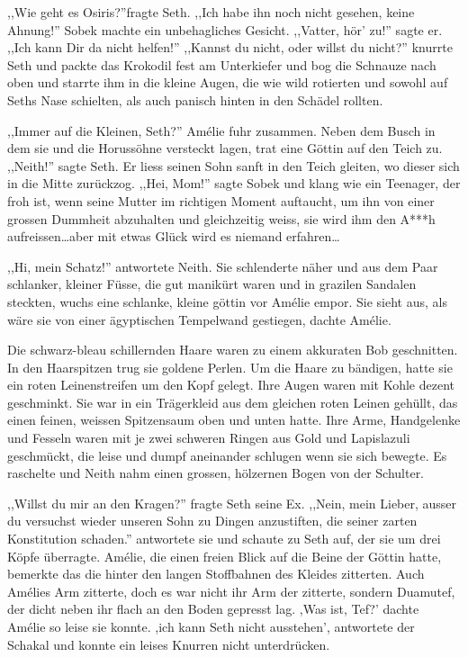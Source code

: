 \documentclass[11pt,titlepage,a5paper]{book}
\begin{document}
,,Wie geht es Osiris?''fragte Seth. ,,Ich habe ihn noch nicht gesehen, keine Ahnung!'' Sobek machte ein unbehagliches Gesicht. ,,Vatter, hör' zu!'' sagte er. ,,Ich kann Dir da nicht helfen!'' ,,Kannst du nicht, oder willst du nicht?'' knurrte Seth und packte das Krokodil fest am Unterkiefer und bog die Schnauze nach oben und starrte ihm in die kleine Augen, die wie wild rotierten und sowohl auf Seths Nase schielten, als auch panisch hinten in den Schädel rollten.

,,Immer auf die Kleinen, Seth?'' Amélie fuhr zusammen. Neben dem Busch in dem sie und die Horussöhne versteckt lagen, trat eine Göttin auf den Teich zu. ,,Neith!'' sagte Seth. Er liess seinen Sohn sanft in den Teich gleiten, wo dieser sich in die Mitte zurückzog. ,,Hei, Mom!'' sagte Sobek und klang wie ein Teenager, der froh ist, wenn seine Mutter im richtigen Moment auftaucht, um ihn von einer grossen Dummheit abzuhalten und gleichzeitig weiss, sie wird ihm den A***h aufreissen\dots aber mit etwas Glück wird es niemand erfahren\dots

,,Hi, mein Schatz!'' antwortete Neith. Sie schlenderte näher und aus dem Paar schlanker, kleiner Füsse, die gut manikürt waren und in grazilen Sandalen steckten, wuchs eine schlanke, kleine göttin vor Amélie empor. Sie sieht aus, als wäre sie von einer ägyptischen Tempelwand gestiegen, dachte Amélie.

Die schwarz-bleau schillernden Haare waren zu einem akkuraten Bob geschnitten. In den Haarspitzen trug sie goldene Perlen. Um die Haare zu bändigen, hatte sie ein roten Leinenstreifen um den Kopf gelegt. Ihre Augen waren mit Kohle dezent geschminkt. Sie war in ein Trägerkleid aus dem gleichen roten Leinen gehüllt, das einen feinen, weissen Spitzensaum oben und unten hatte. Ihre Arme, Handgelenke und Fesseln waren mit je zwei schweren Ringen aus Gold und Lapislazuli geschmückt, die leise und dumpf aneinander schlugen wenn sie sich bewegte. Es raschelte und Neith nahm einen grossen, hölzernen Bogen von der Schulter.

,,Willst du mir an den Kragen?'' fragte Seth seine Ex. ,,Nein, mein Lieber, ausser du versuchst wieder unseren Sohn zu Dingen anzustiften, die seiner zarten Konstitution schaden.'' antwortete sie und schaute zu Seth auf, der sie um drei Köpfe überragte. Amélie, die einen freien Blick auf die Beine der Göttin hatte, bemerkte das die hinter den langen Stoffbahnen des Kleides zitterten. Auch Amélies Arm zitterte, doch es war nicht ihr Arm der zitterte, sondern Duamutef, der dicht neben ihr flach an den Boden gepresst lag. ,Was ist, Tef?' dachte Amélie so leise sie konnte. ,ich kann Seth nicht ausstehen', antwortete der Schakal und konnte ein leises Knurren nicht unterdrücken.
\end{document}

